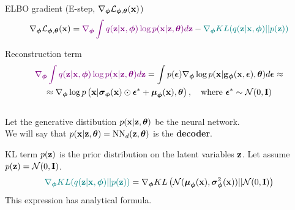 \begin{frame}{ELBO gradient (E-step, $\nabla_{\bphi} \cL_{\bphi, \btheta}(\bx)$)}
	\vspace{-0.3cm}
	\[
		\nabla_{\bphi} \cL_{\bphi, \btheta}(\bx) = {\color{violet}\nabla_{\bphi} \int q(\bz | \bx, \bphi)\log p(\bx | \bz, \btheta) d \bz} - {\color{teal}\nabla_{\bphi} KL(q(\bz | \bx, \bphi) || p(\bz))}
	\]
	\vspace{-0.3cm}
	\begin{block}{Reconstruction term}
		\vspace{-0.7cm}
		\begin{multline*}
			 {\color{violet}\nabla_{\bphi} \int q(\bz | \bx, \bphi)\log p(\bx | \bz, \btheta) d \bz} = \int p(\bepsilon) \nabla_{\bphi} \log p(\bx | \bg_{\bphi}(\bx, \bepsilon), \btheta) d\bepsilon \approx \\
			 \approx \nabla_{\bphi} \log p\left(\bx | \bsigma_{\bphi}(\bx) \odot \bepsilon^* + \bmu_{\bphi}(\bx), \btheta\right), \quad \text{where } \bepsilon^* \sim \cN(0, \bI)
		\end{multline*}
		\vspace{-0.5cm} \\
		Let the generative distibution $p(\bx | \bz, \btheta)$ be the neural network. \\
		We will say that $p(\bx | \bz, \btheta) = \text{NN}_d(\bz, \btheta)$ is the \textbf{decoder}.
	\end{block}
	\begin{block}{KL term}
		$p(\bz)$ is the prior distribution on the latent variables $\bz$. Let assume $p(\bz) = \cN (0, \bI)$.
		\[
			{\color{teal}\nabla_{\bphi} KL(q(\bz | \bx, \bphi) || p(\bz))} = \nabla_{\bphi} KL\left( \cN (\bmu_{\bphi}(\bx), \bsigma^2_{\bphi}(\bx)) || \cN (0, \bI) \right)
		\]
		This expression has analytical formula.
	\end{block}
\end{frame}
